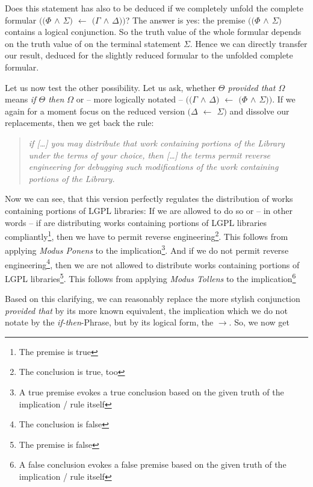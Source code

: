 Does this statement has also to be deduced if we completely unfold the complete
formular \emph{$((\Phi$ $\wedge$ $\Sigma)$ $\leftarrow$ $(\Gamma$ $\wedge$
$\Delta))$}? The answer is yes: the premise \emph{$((\Phi$ $\wedge$
$\Sigma)$} contains a logical conjunction. So the truth value of the whole
formular depends on the truth value of on the terminal statement $\Sigma$.
Hence we can directly transfer our result, deduced for the slightly reduced
formular to the unfolded complete formular.

Let us now test the other possibility. Let us ask, whether \emph{$\Theta$
provided that $\Omega$} means \emph{if $\Theta$ then $\Omega$} or -- more
logically notated -- \emph{$((\Gamma$ $\wedge$ $\Delta)$ $\leftarrow$ $(\Phi$
$\wedge$ $\Sigma))$}. If we again for a moment focus on the reduced version
\emph{$(\Delta$ $\leftarrow$ $\Sigma)$} and dissolve our replacements, then we
get back the rule:

\begin{quote}\noindent\emph{if [\ldots] you may distribute that work containing
portions of the Library under the terms of your choice, then [\ldots] the terms
permit reverse engineering for debugging such modifications of the work
containing portions of the Library.}\end{quote}

Now we can see, that this version perfectly regulates the distribution of works
containing portions of LGPL libraries: If we are allowed to do so or -- in other
words -- if are distributing works containing portions of LGPL libraries
compliantly\footnote{The premise is true}, then we have to permit reverse
engineering\footnote{The conclusion is true, too}. This follows from applying
\emph{Modus Ponens} to the implication\footnote{A true premise evokes a true
conclusion based on the given truth of the implication / rule itself}. And if we
do not permit reverse engineering\footnote{The conclusion is false}, then we are
not allowed to distribute works containing portions of LGPL
libraries\footnote{The premise is false}. This follows from applying \emph{Modus
Tollens} to the implication\footnote{A false conclusion evokes a false premise
based on the given truth of the implication / rule itself}


Based on this clarifying, we can reasonably replace the more stylish conjunction
\emph{provided that} by its more known equivalent, the implication which we do
not notate by the \emph{if-then}-Phrase, but by its logical form, the 
\emph{$\rightarrow$}. So, we now get

